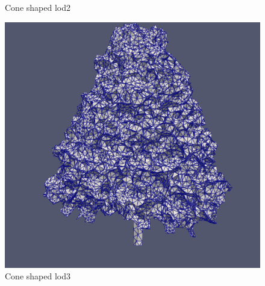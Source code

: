\documentclass[12pt]{article}
\begin{document}
\begin{figure}[H]
\begin{minipage}{0.30\textwidth}
        \caption{Cone shaped lod2}
    \end{minipage}
    \begin{minipage}{0.30\textwidth}
        \centering
        \includegraphics[width=1\textwidth]{images/tree-cone_lod3.png}
        \caption{Cone shaped lod3}
    \end{minipage}
\end{figure}
\end{document}
